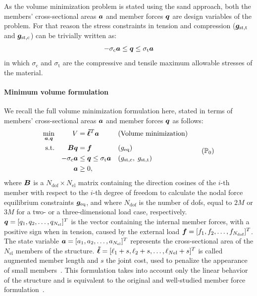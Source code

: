 As the volume minimization problem is stated using the \gls{sand} approach, both the members' cross-sectional areas $\bm{a}$ and member forces $\bm{q}$ are design variables of the problem. For that reason the stress constraints in tension and compression ($\bm{g}_\text{st,t}$ and $\bm{g}_\text{st,c}$) can be trivially written as:
\begin{equation}
    -\sigma_\text{c}\bm{a} \leq \bm{q} \leq \sigma_\text{t}\bm{a}
\end{equation}
in which $\sigma_\text{c}$ and $\sigma_\text{t}$ are the compressive and tensile maximum allowable stresses of the material.

\paragraph{Minimum volume formulation}
We recall the full volume minimization formulation here, stated in terms of members' cross-sectional areas $\bm{a}$ and member forces $\bm{q}$ as follows:
\begin{equation}
    \begin{aligned}
    \min_{\vect{a}, \vect{q}}   && V &= \vect{\tilde{\ell}}^{T}\vect{a} && \textrm{(Volume minimization)}\\
    \textrm{s.t.}   && \matr{B}\vect{q} &= \vect{f} && (g_\text{eq})\\
    && -\sigma_\text{c}\vect{a} &\leq \vect{q} \leq \sigma_\text{t}\vect{a} && (g_\text{st,c}, \; g_\text{st,t}) \\
    && \vect{a} &\geq 0, \\
    \end{aligned}
    \tag{$\mathbb{P}_0$}
    \label{eq:03_optim_original}
\end{equation}
where $\bm{B}$ is a $N_{\text{dof}} \times N_{\text{el}}$ matrix containing the direction cosines of the $i$-th member with respect to the $i$-th degree of freedom to calculate the nodal force equilibrium constraints $\bm{g}_\text{eq}$, and where $N_{\text{dof}}$ is the number of \gls{dofs}, equal to $2M$ or $3M$ for a two- or a three-dimensional load case, respectively. $\bm{q} = [q_1, q_2, \ldots,q_{N_{\text{el}}}]^T$ is the vector containing the internal member forces, with a positive sign when in tension, caused by the external load $\bm{f} = [f_1, f_2, \ldots,f_{N_{\text{dof}}}]^T$. The state variable $\bm{a} = [a_1, a_2, \ldots,a_{N_{\text{el}}}]^T$ represents the cross-sectional area of the $N_{\text{el}}$ members of the structure. $\bm{\tilde{\ell}} = [\ell_1 + s, \ell_2 + s, \ldots,\ell_{N\text{el}} + s]^T$ is called augmented member length and $s$ the joint cost, used to penalize the appearance of small members~. This formulation takes into account only the linear behavior of the structure and is equivalent to the original and well-studied member force formulation~.

